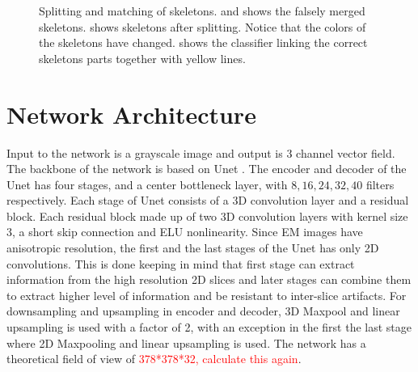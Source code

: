 \begin{figure}[htpb]
\begin{subfigure}[b]{0.24\textwidth}
		\caption{\label{fig:splitNMatchD}}
	\end{subfigure}
	\caption{Splitting and matching of skeletons.  and  shows the falsely merged skeletons.  shows skeletons after splitting. Notice that the colors of the skeletons have changed.  shows the classifier linking the correct skeletons parts together with yellow lines.}
	\label{fig:skelSplitNMatch}
\end{figure}

\section{Network Architecture}
Input to the network is a grayscale image and output is 3 channel vector field.
The backbone of the network is based on Unet \cite{ronneberger2015}. The encoder and decoder of the Unet has four stages, and a center bottleneck layer, with $8, 16, 24, 32, 40$ filters respectively. Each stage of Unet consists of a 3D convolution layer and a residual block. Each residual block made up of two 3D convolution layers with kernel size 3, a short skip connection and ELU nonlinearity. Since EM images have anisotropic resolution, the first and the last stages of the Unet has only 2D convolutions. This is done keeping in mind that first stage can extract information from the high resolution 2D slices and later stages can combine them to extract higher level of information and be resistant to inter-slice artifacts. For downsampling and upsampling in encoder and decoder, 3D Maxpool and linear upsampling is used with a factor of 2, with an exception in the first the last stage where 2D Maxpooling and linear upsampling is used. The network has a theoretical field of view of \textcolor{red}{378*378*32, calculate this again}.  

